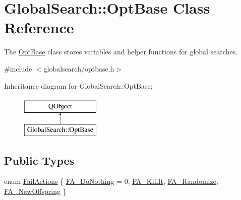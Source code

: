 \hypertarget{classGlobalSearch_1_1OptBase}{\section{Global\-Search\-:\-:Opt\-Base Class Reference}
\label{classGlobalSearch_1_1OptBase}
}


The \hyperlink{classGlobalSearch_1_1OptBase}{Opt\-Base} class stores variables and helper functions for global searches.  




{\ttfamily \#include $<$globalsearch/optbase.\-h$>$}

Inheritance diagram for Global\-Search\-:\-:Opt\-Base\-:\begin{figure}[H]
\begin{center}
\leavevmode
\includegraphics[height=2.000000cm]{classGlobalSearch_1_1OptBase}
\end{center}
\end{figure}
\subsection*{Public Types}
\begin{DoxyCompactItemize}
\item 
enum \hyperlink{classGlobalSearch_1_1OptBase_a970b328cd0a36335c34c6b24c6ac2775}{Fail\-Actions} \{ \hyperlink{classGlobalSearch_1_1OptBase_a970b328cd0a36335c34c6b24c6ac2775ab04d2d04ae7df7ba1da75a185c53dfca}{F\-A\-\_\-\-Do\-Nothing} = 0, 
\hyperlink{classGlobalSearch_1_1OptBase_a970b328cd0a36335c34c6b24c6ac2775a4457ab4b5903c890b0edf0817bf00e74}{F\-A\-\_\-\-Kill\-It}, 
\hyperlink{classGlobalSearch_1_1OptBase_a970b328cd0a36335c34c6b24c6ac2775a79cd7097c06d1b27824ae7c90201276a}{F\-A\-\_\-\-Randomize}, 
\hyperlink{classGlobalSearch_1_1OptBase_a970b328cd0a36335c34c6b24c6ac2775a548d59265329ca034e4e99257b85aa5e}{F\-A\-\_\-\-New\-Offspring}
 \}
\end{DoxyCompactItemize}
